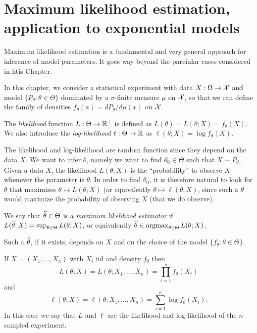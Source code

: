 

\setchapterpreamble[u]{\margintoc}
\chapter{Maximum likelihood estimation, application to exponential models}
\label{chap:maximum_likelihood_estimation}


Maximum likelihood estimation is a fundamental and very general approach for inference of model parameters.
It goes way beyond the parciular cases considered in htis Chapter.

In this chapter, we consider a statistical experiment with data $X : \Omega \rightarrow \operatorname{{\mathcal X}}$ and model $\{ P_\theta : \theta \in \Theta \}$ dominated by a $\sigma$-finite measure $\mu$ on $\operatorname{{\mathcal X}}$, so that we can define the family of densities $f_\theta(x) = d P_\theta / d \mu (x)$ on $\operatorname{{\mathcal X}}$.
\begin{definition}
	The \emph{likelihood} function $L : \Theta \rightarrow \mathbb R^+$ is defined as 
	$L(\theta) = L(\theta; X) = f_\theta(X)$.
	We also introduce the \emph{log-likelihood} $\ell : \Theta \rightarrow \mathbb R$ as $\ell(\theta; X) = \log f_\theta(X)$.
\end{definition}

The likelihood and log-likelihood are random function since they depend on the data $X$.
We want to infer $\theta$, namely we want to find $\theta_0 \in \Theta$ such that $X \sim P_{\theta_0}$.
Given a data $X$, the likelihood $L(\theta; X)$ is the ``probability'' to observe $X$ whenever the parameter is $\theta$. In order to find $\theta_0$, it is therefore natural to look for $\theta$ that maximizes $\theta \mapsto L(\theta; X)$ (or equivalently $\theta \mapsto \ell(\theta; X)$, since such a $\theta$ would maximize the probability of observing $X$ (that we do observe).

\begin{definition}
	We say that $\widehat \theta \in \Theta$ is a \emph{maximum likelihood estimator} if $L(\widehat \theta; X) = \sup_{\theta \in \Theta} L(\theta; X)$, or equivalently $\widehat \theta \in \operatorname*{argmax}_{\theta \in \Theta} L(\theta; X)$.
\end{definition}

Such a $\widehat \theta$, if it exists, depends on $X$ and on the choice of the model $\{ f_\theta : \theta \in \Theta \}$.

If $X = (X_1, \ldots, X_n)$ with $X_i$ iid and density $f_\theta$ then
\begin{equation*}
	L(\theta; X) = L(\theta; X_1, \ldots, X_n) = \prod_{i=1}^n f_\theta(X_i)
\end{equation*}
and
\begin{equation*}
	\ell(\theta; X) = \ell(\theta; X_1, \ldots, X_n) = \sum_{i=1}^n \log f_\theta(X_i).
\end{equation*}
In this case we say that $L$ and $\ell$ are the likelihood and log-likelihood of the $n$-sampled experiment.

